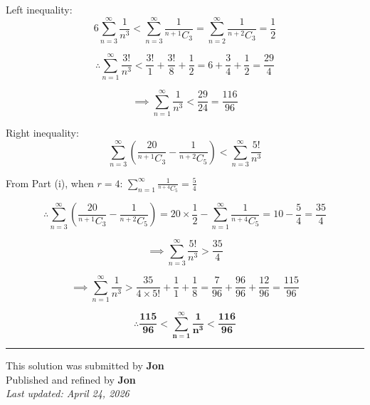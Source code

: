 ﻿\documentclass[12pt]{article}
\begin{document}
\bigskip

Left inequality:
\[
6\sum_{n=3}^{\infty}\frac{1}{n^3} < \sum_{n=3}^{\infty}\frac{1}{{}^{n+1}C_3} = \sum_{n=2}^{\infty}\frac{1}{{}^{n+2}C_3} = \frac{1}{2}
\]

\[
\therefore \sum_{n=1}^{\infty}\frac{3!}{n^3} < \frac{3!}{1} + \frac{3!}{8} + \frac{1}{2} = 6 + \frac{3}{4} + \frac{1}{2} = \frac{29}{4}
\]

\[
\implies \sum_{n=1}^{\infty}\frac{1}{n^3} < \frac{29}{24} = \frac{116}{96}
\]

Right inequality:
\[
\sum_{n=3}^{\infty}\left(\frac{20}{{}^{n+1}C_3} - \frac{1}{{}^{n+2}C_5}\right) < \sum_{n=3}^{\infty}\frac{5!}{n^3}
\]

From Part (i), when $r=4$: $\displaystyle\sum_{n=1}^{\infty}\frac{1}{{}^{n+4}C_5} = \frac{5}{4}$

\[
\therefore \sum_{n=3}^{\infty}\left(\frac{20}{{}^{n+1}C_3}-\frac{1}{{}^{n+2}C_5}\right) = 20\times\frac{1}{2} - \sum_{n=1}^{\infty}\frac{1}{{}^{n+4}C_5} = 10 - \frac{5}{4} = \frac{35}{4}
\]


$$
\implies \sum_{n=3}^{\infty}\frac{5!}{n^3} > \frac{35}{4}$$

\[
\implies \sum_{n=1}^{\infty}\frac{1}{n^3} > \frac{35}{4\times 5!} + \frac{1}{1} + \frac{1}{8} = \frac{7}{96} + \frac{96}{96} + \frac{12}{96} = \frac{115}{96}
\]

\[
\therefore\mathbf{ \frac{115}{96} < \sum_{n=1}^{\infty}\frac{1}{n^3} < \frac{116}{96}}
\]


\bigskip
\hrule

\begin{center}
    This solution was submitted by \textbf{Jon}\\[4pt]
    Published and refined by \textbf{Jon}\\[8pt]
    \textit{Last updated: April 24, 2026}
\end{center}
\end{document}
